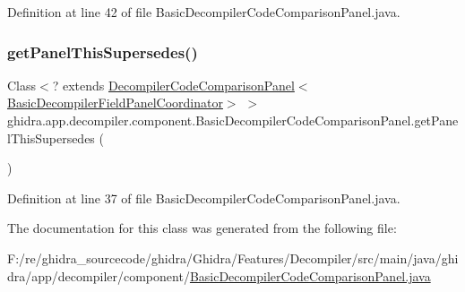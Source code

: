 Definition at line 42 of file Basic\+Decompiler\+Code\+Comparison\+Panel.\+java.

\mbox{\label{classghidra_1_1app_1_1decompiler_1_1component_1_1_basic_decompiler_code_comparison_panel_af5d5e3fec6ca1b693dd82f81533671ef}} 
\subsubsection{\texorpdfstring{getPanelThisSupersedes()}{getPanelThisSupersedes()}}
{\footnotesize\ttfamily Class$<$? extends \mbox{\hyperlink{classghidra_1_1app_1_1decompiler_1_1component_1_1_decompiler_code_comparison_panel}{Decompiler\+Code\+Comparison\+Panel}}$<$\mbox{\hyperlink{classghidra_1_1app_1_1decompiler_1_1component_1_1_basic_decompiler_field_panel_coordinator}{Basic\+Decompiler\+Field\+Panel\+Coordinator}}$>$ $>$ ghidra.\+app.\+decompiler.\+component.\+Basic\+Decompiler\+Code\+Comparison\+Panel.\+get\+Panel\+This\+Supersedes (\begin{DoxyParamCaption}{ }\end{DoxyParamCaption})\hspace{0.3cm}{\ttfamily [inline]}}



Definition at line 37 of file Basic\+Decompiler\+Code\+Comparison\+Panel.\+java.



The documentation for this class was generated from the following file\+:\begin{DoxyCompactItemize}
\item 
F\+:/re/ghidra\+\_\+sourcecode/ghidra/\+Ghidra/\+Features/\+Decompiler/src/main/java/ghidra/app/decompiler/component/\mbox{\hyperlink{_basic_decompiler_code_comparison_panel_8java}{Basic\+Decompiler\+Code\+Comparison\+Panel.\+java}}\end{DoxyCompactItemize}

